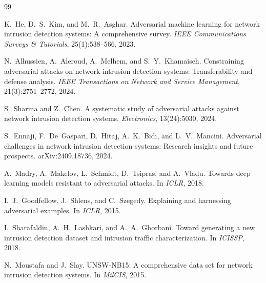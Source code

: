 \documentclass[11pt,a4paper]{article}
\begin{document}

\begin{thebibliography}{99}

K.~He, D.~S.~Kim, and M.~R.~Asghar.
Adversarial machine learning for network intrusion detection systems: A comprehensive survey.
\emph{IEEE Communications Surveys \& Tutorials}, 25(1):538--566, 2023.

N.~Alhussien, A.~Aleroud, A.~Melhem, and S.~Y.~Khamaiseh.
Constraining adversarial attacks on network intrusion detection systems: Transferability and defense analysis.
\emph{IEEE Transactions on Network and Service Management}, 21(3):2751--2772, 2024.

S.~Sharma and Z.~Chen.
A systematic study of adversarial attacks against network intrusion detection systems.
\emph{Electronics}, 13(24):5030, 2024.

S.~Ennaji, F.~De~Gaspari, D.~Hitaj, A.~K.~Bidi, and L.~V.~Mancini.
Adversarial challenges in network intrusion detection systems: Research insights and future prospects.
arXiv:2409.18736, 2024.

A.~Madry, A.~Makelov, L.~Schmidt, D.~Tsipras, and A.~Vladu.
Towards deep learning models resistant to adversarial attacks.
In \emph{ICLR}, 2018.

I.~J.~Goodfellow, J.~Shlens, and C.~Szegedy.
Explaining and harnessing adversarial examples.
In \emph{ICLR}, 2015.

I.~Sharafaldin, A.~H.~Lashkari, and A.~A.~Ghorbani.
Toward generating a new intrusion detection dataset and intrusion traffic characterization.
In \emph{ICISSP}, 2018.

N.~Moustafa and J.~Slay.
UNSW-NB15: A comprehensive data set for network intrusion detection systems.
In \emph{MilCIS}, 2015.

\end{thebibliography}
\end{document}
